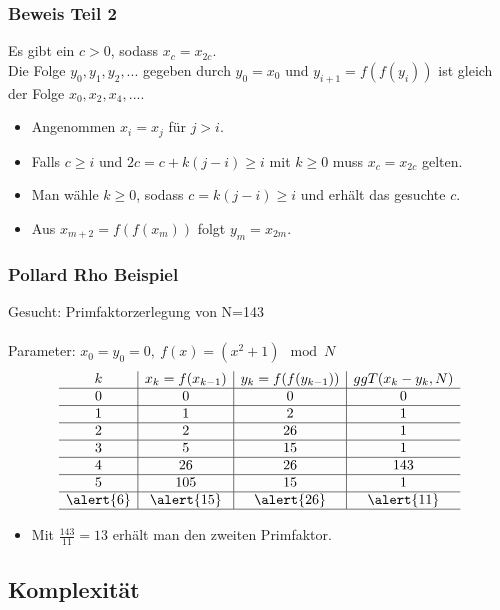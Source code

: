 \documentclass[mathserif, compress, german]{beamer}
\begin{document}
\begin{frame}
  \frametitle{Beweis Teil 2}
Es gibt ein $c>0$, sodass $x_c=x_{2c}$.\\ 
Die Folge $y_0, y_1, y_2,...$ gegeben durch $y_0=x_0$ und $y_{i+1}=f(f(y_i))$ ist gleich der Folge $x_0,x_2,x_4,...$.
  \begin{itemize}
    \item<2-> Angenommen $x_i=x_j$ f\"ur $j>i$.
     \vspace{3mm}
    \item<3-> Falls $c\geq i$ und $2c=c+k(j-i)\geq i$ mit $k\geq 0$ muss $x_c=x_{2c}$ gelten.
     \vspace{3mm}
    \item<4-> Man w\"ahle $k\geq 0$, sodass $c=k(j-i)\geq i$ und erh\"alt das gesuchte $c$.
     \vspace{3mm}
    \item<5-> Aus $x_{m+2}=f(f(x_m))$ folgt $y_m = x_{2m}$.
  \end{itemize}
\end{frame}

\begin{frame}
  \frametitle{Pollard Rho Beispiel}
Gesucht: Primfaktorzerlegung von N=143\\
\ \\
Parameter: $x_0 = y_0 = 0, \ f(x)=(x^2+1)\mod N$
	$$
  \begin{array}{c|c|c|c}
	k & x_k = f(x_{k-1}) & y_k = f(f(y_{k-1})) & ggT(x_k - y_k, N) \\ \hline 
        0 & 0 & 0 & 0 \\ \hline
	1 & 1 & 2 & 1 \\ \hline
	2 & 2 & 26 & 1 \\ \hline
	3 & 5 & 15 & 1 \\ \hline
	4 & 26 & 26 & 143 \\ \hline
	5 & 105 & 15 & 1 \\ \hline
	\alert{6} & \alert{15} & \alert{26} & \alert{11} \\ \hline
  \end{array}
	$$
\begin{itemize}
  \item<2-> Mit $\frac{143}{11}=13$ erh\"alt man den zweiten Primfaktor. 
\end{itemize}
\end{frame}

\subsection{Komplexit\"at}
\end{document}
